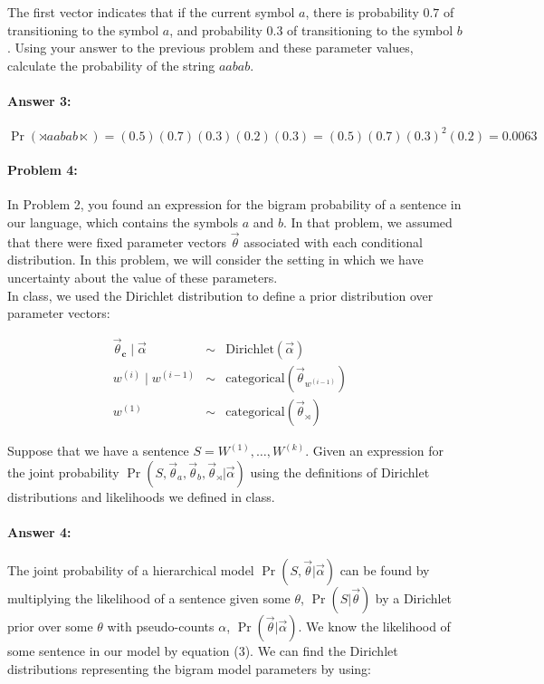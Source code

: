 \documentclass[10pt]{article}
\begin{document}
\noindent The first vector indicates that if the current symbol $a$,
there is probability $0.7$ of transitioning to the symbol $a$, and
probability $0.3$ of transitioning to the symbol $b$. Using your
answer to the previous problem and these parameter values, calculate
the probability of the string $aabab$.

\paragraph{Answer 3:}
$\Pr(\rtimes aabab \ltimes) = (0.5)(0.7)(0.3)(0.2)(0.3) = (0.5)(0.7)(0.3)^2 (0.2) = 0.0063$

\hrulefill
\paragraph{Problem 4:}

In Problem 2, you found an expression for the bigram probability of a
sentence in our language, which contains the symbols $a$ and $b$. In
that problem, we assumed that there were fixed parameter vectors
$\vec{\theta}$ associated with each conditional distribution. In this
problem, we will consider the setting in which we have uncertainty
about the value of these parameters.\\

\noindent In class, we used the Dirichlet distribution to define a
prior distribution over parameter vectors:

\begin{align}
\vec{\theta}_{\mathbf{c}} \mid \vec{\alpha} &\sim& \mathrm{Dirichlet}(\vec{\alpha}) \\
w^{(i)} \mid  w^{(i-1)} &\sim&\mathrm{categorical}(\vec{\theta}_{w^{(i-1)}}) & \\
w^{(1)} &\sim& \mathrm{categorical}(\vec{\theta}_{\rtimes})\ & 
\end{align}

\noindent Suppose that we have a sentence
$S=W^{(1)},\dots,W^{(k)}$. Given an expression for the joint
probability
$\Pr(S, \vec{\theta}_{a}, \vec{\theta}_{b}, \vec{\theta}_{\rtimes} |
\vec{\alpha})$
using the definitions of Dirichlet distributions and likelihoods we
defined in class.

\paragraph{Answer 4:} The joint probability of a hierarchical model $\Pr(S, \vec{\theta} | \vec{\alpha})$ can be found by multiplying the likelihood of a sentence given some $\theta$, $\Pr(S|\vec{\theta})$ by a Dirichlet prior over some $\theta$ with pseudo-counts $\alpha$, $\Pr(\vec{\theta}|\vec{\alpha})$. We know the likelihood of some sentence in our model by equation (3). We can find the Dirichlet distributions representing the bigram model parameters by using:
\end{document}
